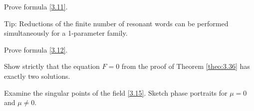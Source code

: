 \begin{task}
	Prove formula \eqref{3.11}.
	
	Tip: Reductions of the finite number of resonant words can be performed simultaneously for a 1-parameter family.
\end{task}

\begin{task}
	Prove formula \eqref{3.12}.
\end{task}

\begin{task}
	Show strictly that the equation $F = 0$ from the proof of Theorem \ref{theo:3.36} has exactly two solutions.
\end{task}

\begin{task}
	Examine the singular points of the field \eqref{3.15}. Sketch phase portraits for $\mu = 0$ and $\mu \neq 0$.
\end{task}

